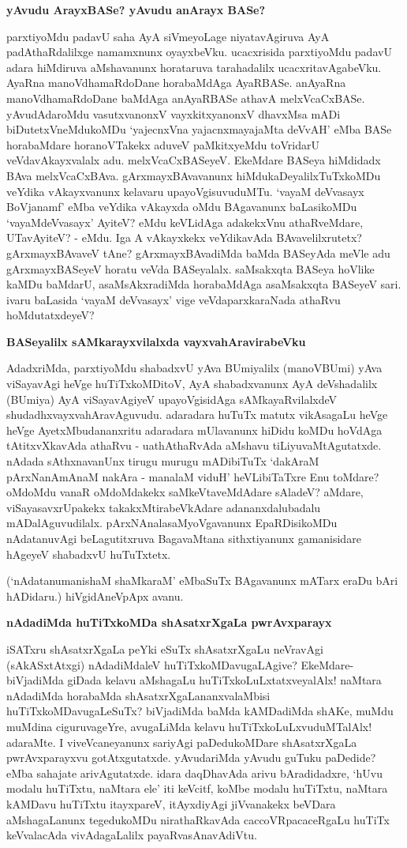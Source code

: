 {\bf yAvudu ArayxBASe? yAvudu anArayx BASe?}

parxtiyoMdu padavU saha AyA siVmeyoLage niyatavAgiruva AyA padAthaRdalilxge namamxnunx oyayxbeVku. ucacxrisida parxtiyoMdu padavU adara hiMdiruva aMshavanunx horataruva tarahadalilx ucacxritavAgabeVku. AyaRna manoVdhamaRdoDane horabaMdAga AyaRBASe. anAyaRna manoVdhamaRdoDane baMdAga anAyaRBASe athavA melxVcaCxBASe. yAvudAdaroMdu vasutxvanonxV vayxkitxyanonxV dhavxMsa mADi biDutetxVneMdukoMDu `yajecnxVna yajacnxmayajaMta deVvAH' eMba BASe horabaMdare horanoVTakekx aduveV paMkitxyeMdu toVridarU veVdavAkayxvalalx adu. melxVcaCxBASeyeV. EkeMdare BASeya hiMdidadx BAva melxVcaCxBAva. gArxmayxBAvavanunx hiMdukaDeyalilxTuTxkoMDu veYdika vAkayxvanunx kelavaru upayoVgisuvuduMTu. `vayaM deVvasayx BoVjanamf' eMba veYdika vAkayxda oMdu BAgavanunx baLasikoMDu `vayaMdeVvasayx' AyiteV? eMdu keVLidAga adakekxVnu athaRveMdare, UTavAyiteV? - eMdu. Iga A vAkayxkekx veYdikavAda BAvavelilxrutetx? gArxmayxBAvaveV tAne? gArxmayxBAvadiMda baMda BASeyAda meVle adu gArxmayxBASeyeV horatu veVda BASeyalalx. saMsakxqta BASeya hoVlike kaMDu baMdarU, asaMsAkxradiMda horabaMdAga asaMsakxqta BASeyeV sari. ivaru baLasida `vayaM deVvasayx' vige veVdaparxkaraNada athaRvu hoMdutatxdeyeV?

{\bf BASeyalilx sAMkarayxvilalxda vayxvahAravirabeVku}

AdadxriMda, parxtiyoMdu shabadxvU yAva BUmiyalilx (manoVBUmi) yAva viSayavAgi heVge huTiTxkoMDitoV, AyA shabadxvanunx AyA deVshadalilx (BUmiya) AyA viSayavAgiyeV upayoVgisidAga sAMkayaRvilalxdeV shudadhxvayxvahAravAguvudu. adaradara huTuTx matutx vikAsagaLu heVge heVge AyetxMbudananxritu adaradara mUlavanunx hiDidu koMDu hoVdAga tAtitxvXkavAda athaRvu - uathAthaRvAda aMshavu tiLiyuvaMtAgutatxde. nAdada sAthxnavanUnx tirugu murugu mADibiTuTx `dakAraM pArxNanAmAnaM nakAra - manalaM viduH' heVLibiTaTxre Enu toMdare? oMdoMdu vanaR oMdoMdakekx saMkeVtaveMdAdare sAladeV? aMdare, viSayasavxrUpakekx takakxMtirabeVkAdare adananxdalubadalu mADalAguvudilalx. pArxNAnalasaMyoVgavanunx EpaRDisikoMDu nAdatanuvAgi beLagutitxruva BagavaMtana sithxtiyanunx gamanisidare hAgeyeV shabadxvU huTuTxtetx.

(`nAdatanumanishaM shaMkaraM' eMbaSuTx BAgavanunx mATarx eraDu bAri hADidaru.) hiVgidAneVpApx avanu.

{\bf nAdadiMda huTiTxkoMDa shAsatxrXgaLa pwrAvxparayx}

iSATxru shAsatxrXgaLa peYki eSuTx shAsatxrXgaLu neVravAgi (sAkASxtAtxgi) nAdadiMdaleV huTiTxkoMDavugaLAgive? EkeMdare- biVjadiMda giDada kelavu aMshagaLu huTiTxkoLuLxtatxveyalAlx! naMtara nAdadiMda horabaMda shAsatxrXgaLananxvalaMbisi huTiTxkoMDavugaLeSuTx? biVjadiMda baMda kAMDadiMda shAKe, muMdu muMdina ciguruvageYre, avugaLiMda kelavu huTiTxkoLuLxvuduMTalAlx! adaraMte. I viveVcaneyanunx sariyAgi paDedukoMDare shAsatxrXgaLa pwrAvxparayxvu gotAtxgutatxde. yAvudariMda yAvudu guTuku paDedide? eMba sahajate arivAgutatxde. idara daqDhavAda arivu bAradidadxre, `hUvu modalu huTiTxtu, naMtara ele' iti keVcitf, koMbe modalu huTiTxtu, naMtara kAMDavu huTiTxtu itayxpareV, itAyxdiyAgi jiVvanakekx beVDara aMshagaLanunx tegedukoMDu nirathaRkavAda caccoVRpacaceRgaLu huTiTx keVvalacAda vivAdagaLalilx payaRvasAnavAdiVtu.

